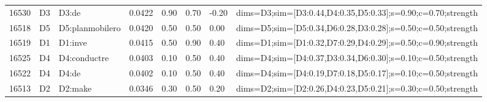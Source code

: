 \begin{table}[htbp]
\begin{tabular}{@{}lllllllc@{}}
16530 & D3 & D3:de & 0.0422 & 0.90 & 0.70 & -0.20 & dims=D3;sim=[D3:0.44,D4:0.35,D5:0.33];s=0.90;c=0.70;strength \\
16518 & D5 & D5:planmobilero & 0.0420 & 0.50 & 0.50 & 0.00 & dims=D5;sim=[D5:0.34,D6:0.28,D3:0.28];s=0.50;c=0.50;strength \\
16519 & D1 & D1:inve & 0.0415 & 0.50 & 0.90 & 0.40 & dims=D1;sim=[D1:0.32,D7:0.29,D4:0.29];s=0.50;c=0.90;strength \\
16525 & D4 & D4:conductre & 0.0403 & 0.10 & 0.50 & 0.40 & dims=D4;sim=[D4:0.37,D3:0.34,D6:0.30];s=0.10;c=0.50;strength \\
16522 & D4 & D4:de & 0.0402 & 0.10 & 0.50 & 0.40 & dims=D4;sim=[D4:0.19,D7:0.18,D5:0.17];s=0.10;c=0.50;strength \\
16513 & D2 & D2:make & 0.0346 & 0.30 & 0.50 & 0.20 & dims=D2;sim=[D2:0.26,D4:0.23,D5:0.21];s=0.30;c=0.50;strength \\
\bottomrule
\end{tabular}
\end{table}